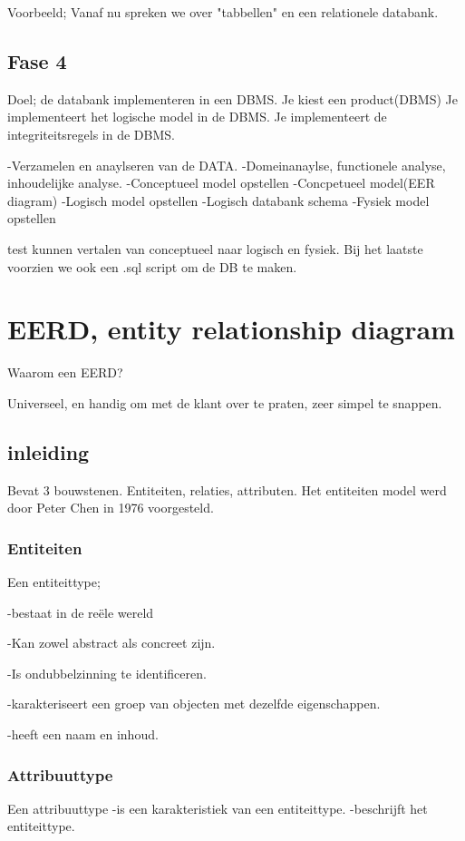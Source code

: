 \documentclass{article}
\begin{document}
Voorbeeld;
Vanaf nu spreken we over "tabbellen" en een relationele databank.

\subsection{Fase 4}
Doel; de databank implementeren in een DBMS.
Je kiest een product(DBMS)
Je implementeert het logische model in de DBMS.
Je implementeert de integriteitsregels in de DBMS.

-Verzamelen en anaylseren van de DATA.
	-Domeinanaylse, functionele analyse, inhoudelijke analyse.
-Conceptueel model opstellen
	-Concpetueel model(EER diagram)
-Logisch model opstellen
	-Logisch databank schema
-Fysiek model opstellen

test kunnen vertalen van conceptueel naar logisch en fysiek.
Bij het laatste voorzien we ook een .sql script om de DB te maken.


\section{EERD, entity relationship diagram}
Waarom een EERD?

Universeel, en handig om met de klant over te praten, zeer simpel te snappen.

\subsection{inleiding}
Bevat 3 bouwstenen.
Entiteiten, relaties, attributen.
Het entiteiten model werd door Peter Chen in 1976 voorgesteld.

\subsubsection{Entiteiten}
Een entiteittype;
	
	-bestaat in de reële wereld
	
	-Kan zowel abstract als concreet zijn.

	-Is ondubbelzinning te identificeren.

	-karakteriseert een groep van objecten met dezelfde eigenschappen.

	-heeft een naam en inhoud.

\subsubsection{Attribuuttype}
Een attribuuttype
	-is een karakteristiek van een entiteittype.
	-beschrijft het entiteittype.
\end{document}
